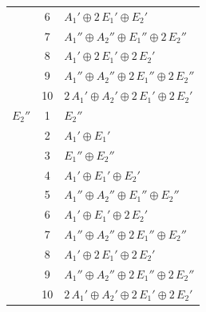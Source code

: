 \documentclass[11pt]{article}
\begin{document}
\begin{longtable}{l c p{}}
 & 6 & $A_{1}'\oplus 2\,E_{1}'\oplus E_{2}'$\\
 & 7 & $A_{1}''\oplus A_{2}''\oplus E_{1}''\oplus 2\,E_{2}''$\\
 & 8 & $A_{1}'\oplus 2\,E_{1}'\oplus 2\,E_{2}'$\\
 & 9 & $A_{1}''\oplus A_{2}''\oplus 2\,E_{1}''\oplus 2\,E_{2}''$\\
 & 10 & $2\,A_{1}'\oplus A_{2}'\oplus 2\,E_{1}'\oplus 2\,E_{2}'$\\
\hline
$E_{2}''$ & 1 & $E_{2}''$\\
 & 2 & $A_{1}'\oplus E_{1}'$\\
 & 3 & $E_{1}''\oplus E_{2}''$\\
 & 4 & $A_{1}'\oplus E_{1}'\oplus E_{2}'$\\
 & 5 & $A_{1}''\oplus A_{2}''\oplus E_{1}''\oplus E_{2}''$\\
 & 6 & $A_{1}'\oplus E_{1}'\oplus 2\,E_{2}'$\\
 & 7 & $A_{1}''\oplus A_{2}''\oplus 2\,E_{1}''\oplus E_{2}''$\\
 & 8 & $A_{1}'\oplus 2\,E_{1}'\oplus 2\,E_{2}'$\\
 & 9 & $A_{1}''\oplus A_{2}''\oplus 2\,E_{1}''\oplus 2\,E_{2}''$\\
 & 10 & $2\,A_{1}'\oplus A_{2}'\oplus 2\,E_{1}'\oplus 2\,E_{2}'$\\
\hline
\end{longtable}
\end{document}
